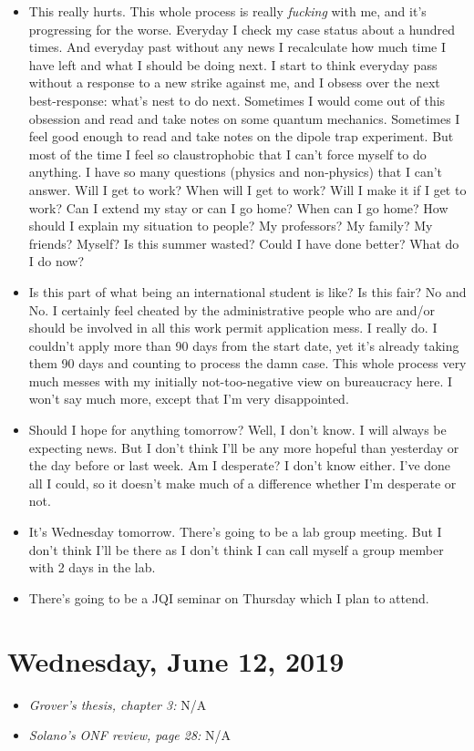 \documentclass{report}
\theoremstyle{definition}
\begin{document}
\begin{itemize}
	\item This really hurts. This whole process is really \textit{fucking} with me, and it's progressing for the worse. Everyday I check my case status about a hundred times. And everyday past without any news I recalculate how much time I have left and what I should be doing next. I start to think everyday pass without a response to a new strike against me, and I obsess over the next best-response: what's nest to do next. Sometimes I would come out of this obsession and read and take notes on some quantum mechanics. Sometimes I feel good enough to read and take notes on the dipole trap experiment. But most of the time I feel so claustrophobic that I can't force myself to do anything. I have so many questions (physics and non-physics) that I can't answer. Will I get to work? When will I get to work? Will I make it if I get to work? Can I extend my stay or can I go home? When can I go home? How should I explain my situation to people? My professors? My family? My friends? Myself? Is this summer wasted? Could I have done better? What do I do now? 
	
	\item Is this part of what being an international student is like? Is this fair? No and No. I certainly feel cheated by the administrative people who are and/or should be involved in all this work permit application mess. I really do. I couldn't apply more than 90 days from the start date, yet it's already taking them 90 days and counting to process the damn case. 
	This whole process very much messes with my initially not-too-negative view on bureaucracy here. I won't say much more, except that I'm very disappointed. 
	
	\item Should I hope for anything tomorrow? Well, I don't know. I will always be expecting news. But I don't think I'll be any more hopeful than yesterday or the day before or last week. Am I desperate? I don't know either. I've done all I could, so it doesn't make much of a difference whether I'm desperate or not.
	
	\item It's Wednesday tomorrow. There's going to be a lab group meeting. But I don't think I'll be there as I don't think I can call myself a group member with 2 days in the lab.
	
	\item There's going to be a JQI seminar on Thursday which I plan to attend. 
	
	
\end{itemize}


\section{Wednesday, June 12, 2019}
\begin{itemize}
	\item \textit{Grover's thesis, chapter 3:} N/A
	
	
	\item \textit{Solano's ONF review, page 28:} N/A
\end{itemize}
\end{document}
